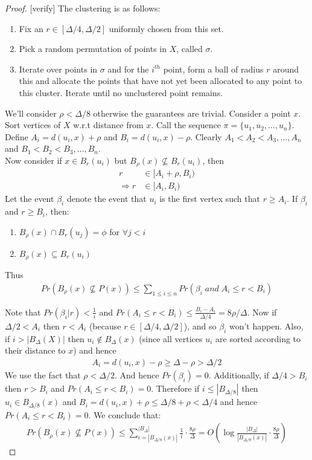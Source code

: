 \begin{proof} {\color{red} [verify]}
The clustering is as follows:
\begin{enumerate}
\item Fix an $r \in [\Delta/4,\Delta/2]$ uniformly chosen from this set.
\item Pick a random permutation of points in $X$, called $\sigma$.
\item Iterate over points in $\sigma$ and for the $i^{th}$ point, form a ball of radius $r$ around this and allocate the points that have not yet been allocated to any point to this cluster. Iterate until no unclustered point remains.
\end{enumerate}

We'll consider $\rho<\Delta/8$ otherwise the guarantees are trivial. Consider a point $x$. Sort vertices of $X$ w.r.t distance from $x$. Call the sequence $\pi=\{u_1,u_2,\dots,u_n\}$. Define $A_i=d(u_i,x)+\rho$ and $B_i=d(u_i,x)-\rho$. Clearly $A_1<A_2<A_3,\dots,A_n$ and $B_1<B_2<B_3,\dots,B_n$.\\
Now consider if $x\in B_r(u_i)$ but $B_{\rho}(x)\nsubseteq B_r(u_i)$, then
\begin{align*}
    r &\in [A_i + \rho,B_i) \\
    \Rightarrow r &\in [A_i,B_i)
\end{align*}
Let the event $\beta_i$ denote the event that $u_i$ is the first vertex such that $r\geq A_i$. If $\beta_i$ and $r\geq B_i$, then:
\begin{enumerate}
    \item $B_\rho(x)\cap B_r(u_j)=\phi$ for $\forall j<i$
    \item $B_\rho(x)\subseteq B_r(u_i)$
\end{enumerate}
Thus
\begin{align*}
    Pr(B_{\rho}(x)\nsubseteq P(x)) \leq \sum_{1\leq i\leq n}Pr(\beta_i \; and \; A_i\leq r < B_i)
\end{align*}

Note that $Pr(\beta_i|r)<\frac{1}{i}$ and $Pr(A_i\leq r < B_i) \leq \frac{B_i-A_i}{\Delta/4}=8\rho/\Delta$. Now if $\Delta/2<A_i$ then $r<A_i$ (because $r\in[\Delta/4,\Delta/2]$), and so $\beta_i$ won't happen. Also, if $i>|B_\Delta(X)|$ then $u_i\notin B_{\Delta}(x)$ (since all vertices $u_i$ are sorted according to their distance to $x$) and hence
\begin{align*}
    A_i=d(u_i,x)-\rho \geq \Delta-\rho > \Delta/2 
\end{align*}
We use the fact that $\rho<\Delta/2$. And hence $Pr(\beta_i)=0$. Additionally, if $\Delta/4>B_i$ then $r>B_i$ and $Pr(A_i \leq r < B_i)=0$. Therefore if $i\leq |B_{\Delta/8}|$ then $u_i\in B_{\Delta/8}(x)$ and $B_i=d(u_i,x)+\rho \leq \Delta/8+ \rho < \Delta/4$ and hence $Pr(A_i\leq r <B_i)=0$. We conclude that:
\begin{align*}
    Pr(B_\rho(x)\nsubseteq P(x)) \leq \sum_{i=|B_{\Delta/8}(x)|}^{|B_{\Delta}|}\frac{1}{i}\cdot \frac{8\rho}{\Delta} = O\left(\log\frac{|B_{\Delta}|}{|B_{\Delta/8}(x)|} \cdot \frac{8\rho}{ \Delta } \right)
\end{align*}


\end{proof}
